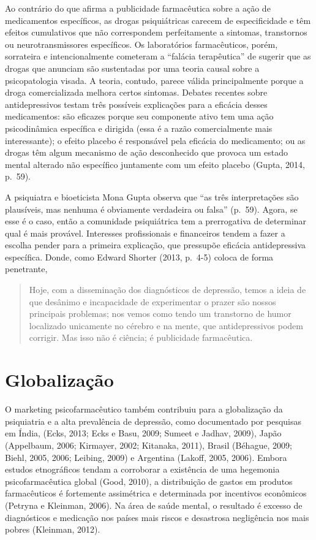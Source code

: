 Ao contrário do que afirma a publicidade farmacêutica sobre a ação de
medicamentos específicos, as drogas psiquiátricas carecem de
especificidade e têm efeitos cumulativos que não correspondem
perfeitamente a sintomas, transtornos ou neurotransmissores específicos.
Os laboratórios farmacêuticos, porém, sorrateira e intencionalmente
cometeram a ``falácia terapêutica'' de sugerir que as drogas que
anunciam são sustentadas por uma teoria causal sobre a psicopatologia
visada. A teoria, contudo, parece válida principalmente porque a droga
comercializada melhora certos sintomas. Debates recentes sobre
antidepressivos testam três possíveis explicações para a eficácia desses
medicamentos: são eficazes porque seu componente ativo tem uma ação
psicodinâmica específica e dirigida (essa é a razão comercialmente mais
interessante); o efeito placebo é responsável pela eficácia do
medicamento; ou as drogas têm algum mecanismo de ação desconhecido que
provoca um estado mental alterado não específico juntamente com um
efeito placebo (Gupta, 2014, p.~59).

A psiquiatra e bioeticista Mona Gupta observa que ``as três
interpretações são plausíveis, mas nenhuma é obviamente verdadeira ou
falsa'' (p.~59). Agora, se esse é o caso, então a comunidade psiquiátrica
tem a prerrogativa de determinar qual é mais provável. Interesses
profissionais e financeiros tendem a fazer a escolha pender para a
primeira explicação, que pressupõe eficácia antidepressiva específica.
Donde, como Edward Shorter (2013, p.~4-5) coloca de forma penetrante,

\begin{quote}
Hoje, com a disseminação dos diagnósticos de depressão, temos a ideia de
que desânimo e incapacidade de experimentar o prazer são nossos
principais problemas; nos vemos como tendo um transtorno de humor
localizado unicamente no cérebro e na mente, que antidepressivos podem
corrigir. Mas isso não é ciência; é publicidade farmacêutica.
\end{quote}

\chapter{Globalização}

O marketing psicofarmacêutico também contribuiu para a globalização da
psiquiatria e a alta prevalência de depressão, como documentado por
pesquisas em Índia, (Ecks, 2013; Ecks e Basu, 2009; Sumeet e Jadhav,
2009), Japão (Appelbaum, 2006; Kirmayer, 2002; Kitanaka, 2011), Brasil
(Béhague, 2009; Biehl, 2005, 2006; Leibing, 2009) e Argentina (Lakoff,
2005, 2006). Embora estudos etnográficos tendam a corroborar a
existência de uma hegemonia psicofarmacêutica global (Good, 2010), a
distribuição de gastos em produtos farmacêuticos é fortemente
assimétrica e determinada por incentivos econômicos (Petryna e Kleinman,
2006). Na área de saúde mental, o resultado é excesso de diagnósticos e
medicação nos países mais riscos e desastrosa negligência nos mais
pobres (Kleinman, 2012).

